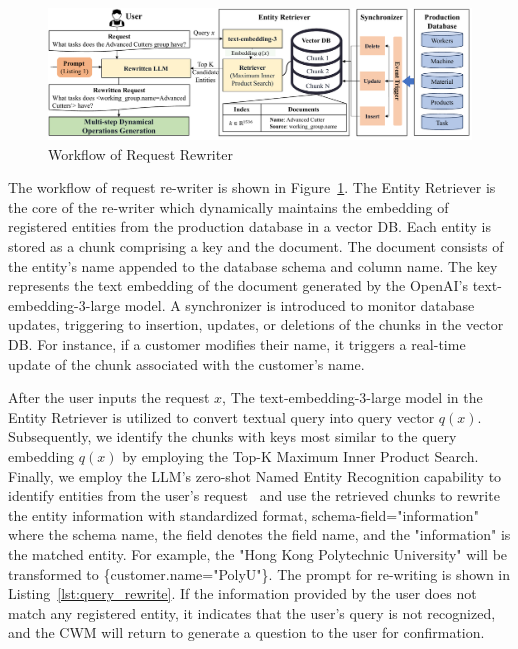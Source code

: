 \documentclass[preprint,12pt]{elsarticle}
\begin{document}
\begin{figure}
    \centering
    \includegraphics[width=\linewidth]{figs/query_rewrite.pdf}
    \caption{Workflow of Request Rewriter}
    \label{fig:tech_request_rewriter}
\end{figure}

The workflow of request re-writer is shown in Figure~\ref{fig:tech_request_rewriter}.
The Entity Retriever is the core of the re-writer which dynamically maintains the embedding of registered entities from the production database in a vector DB.
Each entity is stored as a chunk comprising a key and the document.
The document consists of the entity's name appended to the database schema and column name.
The key represents the text embedding of the document generated by the OpenAI's text-embedding-3-large model.
A synchronizer is introduced to monitor database updates, triggering to insertion, updates, or deletions of the chunks in the vector DB.
For instance, if a customer modifies their name, it triggers a real-time update of the chunk associated with the customer's name.

After the user inputs the request $x$,
The text-embedding-3-large model in the Entity Retriever is utilized to convert textual query into query vector $q(x)$. 
Subsequently, we identify the chunks with keys most similar to the query embedding $q(x)$ by employing the Top-K Maximum Inner Product Search.
Finally, we employ the LLM's zero-shot Named Entity Recognition capability to identify entities from the user's request~\cite{xie2023self} and use the retrieved chunks to rewrite the entity information with standardized format, {schema-field="information"} where the schema name, the field denotes the field name, and the "information" is the matched entity.
For example, the "Hong Kong Polytechnic University" will be transformed to \{customer.name="PolyU"\}.
The prompt for re-writing is shown in Listing~\ref{lst:query_rewrite}.
If the information provided by the user does not match any registered entity, it indicates that the user's query is not recognized, and the CWM will return to generate a question to the user for confirmation.
\end{document}
